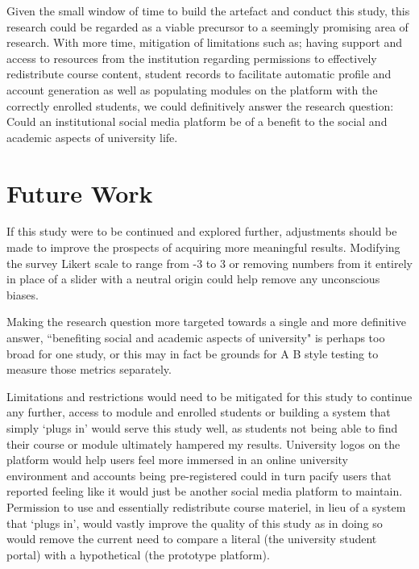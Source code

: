 \documentclass[lettersize,journal]{IEEEtran}
\begin{document}
Given the small window of time to build the artefact and conduct this study, this research could be regarded as a viable precursor to a seemingly promising area of research. With more time, mitigation of 
limitations such as; having support and access to resources from the institution regarding permissions to effectively redistribute course content, student records to facilitate automatic profile and
account generation as well as populating modules on the platform with the correctly enrolled students, we could definitively answer the research question: Could an institutional social media platform be of a benefit
to the social and academic aspects of university life.




\section{Future Work}
	If this study were to be continued and explored further, adjustments should be made to improve the prospects of acquiring more meaningful results. Modifying the survey Likert scale to range 
	from -3 to 3 or removing numbers from it entirely in place of a slider with a neutral origin could help remove any unconscious biases.

	Making the research question more targeted towards a single and more definitive answer, ``benefiting social and academic aspects of university" is perhaps too broad for one study,
	or this may in fact be grounds for A B style testing to measure	those metrics separately.

	Limitations and restrictions would need to be mitigated for this study to continue any further, access to module and enrolled students or building a system that simply
	`plugs in' would serve this study well, as students not being able to find their course or module ultimately hampered my results. University logos on the platform  would help 
	users feel more immersed in an online university environment and accounts being pre-registered could in turn pacify users that reported feeling like it would just be another social media
	platform to maintain. Permission to use and essentially redistribute course materiel, in lieu of a system that `plugs in', would vastly improve the quality of this study as in doing so would
	remove the current need to compare a literal (the university student portal) with a hypothetical (the prototype platform).
\end{document}
